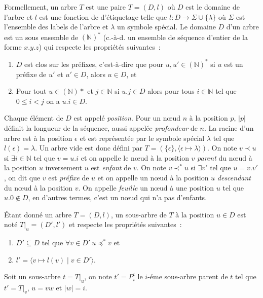 \begin{definition}
    \label{def:struct:tree}
    Formellement, un arbre $T$ est une paire $T = (D, l)$ où $D$ est le domaine de l'arbre et $l$ est une fonction de d'étiquetage telle que $l : D \to \Sigma \cup \{\lambda\}$ où $\Sigma$ est l'ensemble des labels de l'arbre et $\lambda$ un symbole spécial.
    Le domaine $D$ d'un arbre est un sous ensemble de $(\mathbb{N})^*$ (c.-à-d. un ensemble de séquence d'entier de la forme $x.y.z$) qui respecte les propriétés suivantes :
    \begin{enumerate}
        \item $D$ est clos sur les préfixes, c'est-à-dire que pour $u, u' \in (\mathbb{N})^*$ si $u$ est un préfixe de $u'$ et $u' \in D$, alors $u \in D$, et
        \item Pour tout $u \in (\mathbb{N})*$ et $j \in \mathbb{N}$ si $u.j \in D$ alors pour tous $i \in \mathbb{N}$ tel que $0 \leq i < j$ on a $u.i \in D$.
    \end{enumerate}
    Chaque élément de $D$ est appelé \emph{position}.
    Pour un nœud $n$ à la position $p$, $|p|$ définit la longueur de la séquence, aussi appelée \emph{profondeur} de $n$.
    La racine d'un arbre est à la position $\epsilon$ et est représentée par le symbole spécial $\lambda$ tel que $l(\epsilon) = \lambda$.
    Un arbre vide est donc défini par  $T = (\{\epsilon\}, \langle \epsilon \mapsto \lambda \rangle)$.
    On note $v \prec u$ si $\exists i \in \mathbb{N}$ tel que $v = u.i$ et on appelle le nœud à la position $v$ \emph{parent} du nœud à la position $u$ inversement $u$ est \emph{enfant} de $v$.  
    On note $v \prec^* u$ si $\exists v'$ tel que $u = v.v'$, on dit que $v$ est \emph{préfixe} de $u$ et on appelle un nœud à la position $u$ \emph{descendant} du nœud à la position $v$.
    On appelle \emph{feuille} un nœud à une position $u$ tel que $u.0 \notin D$, en d'autres termes, c'est un nœud qui n'a pas d'enfants.
\end{definition}

\begin{definition}
    Étant donné un arbre $T = (D, l)$, un sous-arbre de $T$ à la position $u \in D$ est noté $T|_u = (D', l')$ et respecte les propriétés suivantes :
    \begin{enumerate}
        \item $D' \subseteq D$ tel que $\forall v \in D' ~ u \preceq^* v$ et
        \item $l' = \langle v \mapsto l(v) \mid v \in D' \rangle $.
    \end{enumerate}
    Soit un sous-arbre $t = T|_u$, on note $t' = P_i^t$ le $i$-éme sous-arbre parent de $t$ tel que $t' = T|_v$,  $u = vw$ et $|w| = i$.
\end{definition}

